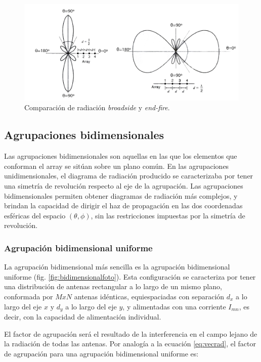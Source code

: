 \begin{figure}[h]
    \centering
        \includegraphics[width=\textwidth]{archivos/array/side}
        \caption{Comparación de radiación \textit{broadside} y \textit{end-fire}.}
        \label{fig:side}
\end{figure}

\subsection{Agrupaciones bidimensionales}
\par Las agrupaciones bidimensionales son aquellas en las que los elementos que conforman el array se sitúan sobre un plano común. En las agrupaciones unidimensionales, el diagrama de radiación producido se caracterizaba por tener una simetría de revolución respecto al eje de la agrupación. Las agrupaciones bidimensionales permiten obtener diagramas de radiación más complejos, y brindan la capacidad de dirigir el haz de propagación en las dos coordenadas esféricas del espacio $(\theta, \phi)$, sin las restricciones impuestas por la simetría de revolución. \cite{Cardama2002}
\\
\subsubsection{Agrupación bidimensional uniforme}
\par La agrupación bidimensional más sencilla es la agrupación bidimensional uniforme (fig. \ref{fig:bidimensionalfoto}). Esta configuración se caracteriza por tener una distribución de antenas rectangular a lo largo de un mismo plano, conformada por $MxN$ antenas idénticas, equiespaciadas con separación $d_{x}$ a lo largo del eje $x$ y $d_{y}$ a lo largo del eje $y$, y alimentadas con una corriente $I_{mn}$, es decir, con la capacidad de alimentación individual. 
\\
\par El factor de agrupación será el resultado de la interferencia en el campo lejano de la radiación de todas las antenas. Por analogía a la ecuación \ref{eq:vecrad}, el factor de agrupación para una agrupación bidimensional uniforme es: 

